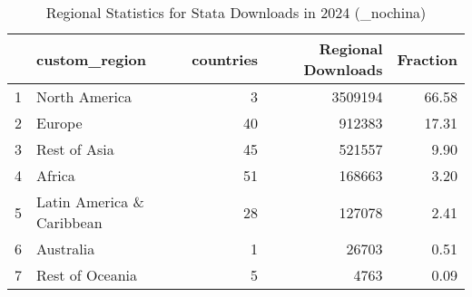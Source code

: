 \begin{table}[ht]
\centering
\begin{tabular}{rlrrr}
  \hline
 & custom\_region & countries & Regional Downloads & Fraction \\ 
  \hline
1 & North America &   3 & 3509194 & 66.58 \\ 
  2 & Europe &  40 & 912383 & 17.31 \\ 
  3 & Rest of Asia &  45 & 521557 & 9.90 \\ 
  4 & Africa &  51 & 168663 & 3.20 \\ 
  5 & Latin America \& Caribbean &  28 & 127078 & 2.41 \\ 
  6 & Australia &   1 & 26703 & 0.51 \\ 
  7 & Rest of Oceania &   5 & 4763 & 0.09 \\ 
   \hline
\end{tabular}
\caption{Regional Statistics for Stata Downloads in 2024 (_nochina)} 
\label{tab:stata_downloads_regional_stats_2024_nochina}
\end{table}
